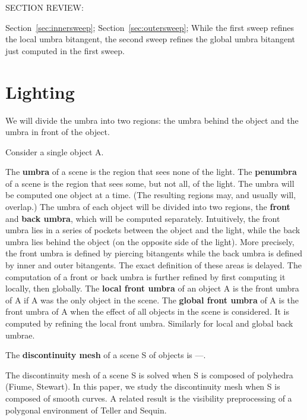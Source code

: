 \documentclass[9pt,twocolumn]{article}
\begin{document}
SECTION REVIEW:

Section~\ref{sec:innersweep};
Section~\ref{sec:outersweep};
While the first sweep refines the local umbra bitangent,
the second sweep refines the global umbra bitangent
just computed in the first sweep.

\clearpage

\section{Lighting}

We will divide the umbra into two regions: the umbra behind the object
and the umbra in front of the object.

Consider a single object A.

\begin{defn2}
The {\bf umbra} of a scene is the region that sees none of the light.
The {\bf penumbra} of a scene is the region that sees some, but not all,
of the light.
The umbra will be computed one object at a time.
(The resulting regions may, and usually will, overlap.)
The umbra of each object will be divided into two regions, the {\bf front} 
and {\bf back umbra}, which will be computed separately.
Intuitively, the front umbra lies in a series of pockets between the 
object and the light, while the back umbra lies behind the object
(on the opposite side of the light).
More precisely, the front umbra is defined by piercing bitangents
while the back umbra is defined by inner and outer bitangents.
The exact definition of these areas is delayed.
The computation of a front or back umbra is further refined
by first computing it locally, then globally.
The {\bf local front umbra} of an object A is the 
front umbra of A if A was the only object in the scene.
The {\bf global front umbra} of A is the front umbra of A when the effect
of all objects in the scene is considered.
It is computed by refining the local front umbra.
Similarly for local and global back umbrae.
\end{defn2}

\begin{defn2}
The {\bf discontinuity mesh} of a scene S of objects is ---.
\end{defn2}

The discontinuity mesh of a scene S is solved when S is composed of polyhedra (Fiume, Stewart).
In this paper, we study the discontinuity mesh when S is composed of smooth curves.
A related result is the visibility preprocessing of a polygonal environment of Teller and Sequin.
\end{document}

